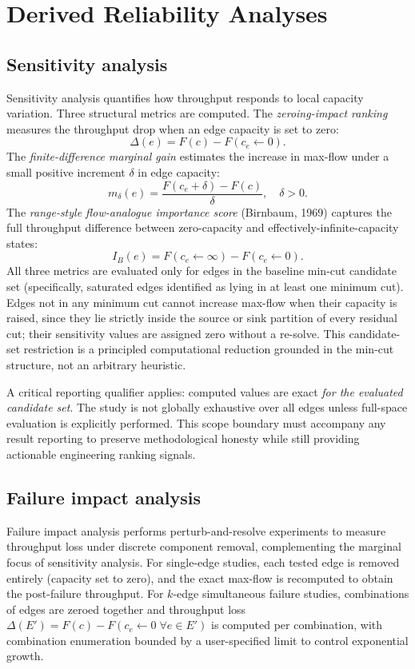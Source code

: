\documentclass[12pt]{report}
\begin{document}
\section{Derived Reliability Analyses}
\label{sec:derived}

\subsection{Sensitivity analysis}

Sensitivity analysis quantifies how throughput responds to local capacity variation. Three structural metrics are computed. The \emph{zeroing-impact ranking} measures the throughput drop when an edge capacity is set to zero:
\[
\Delta(e) = F(c) - F(c_e \leftarrow 0).
\]
The \emph{finite-difference marginal gain} estimates the increase in max-flow under a small positive increment $\delta$ in edge capacity:
\[
m_\delta(e) = \frac{F(c_e + \delta) - F(c)}{\delta}, \quad \delta > 0.
\]
The \emph{range-style flow-analogue importance score} (Birnbaum, 1969) captures the full throughput difference between zero-capacity and effectively-infinite-capacity states:
\[
I_B(e) = F(c_e \leftarrow \infty) - F(c_e \leftarrow 0).
\]
All three metrics are evaluated only for edges in the baseline min-cut candidate set (specifically, saturated edges identified as lying in at least one minimum cut). Edges not in any minimum cut cannot increase max-flow when their capacity is raised, since they lie strictly inside the source or sink partition of every residual cut; their sensitivity values are assigned zero without a re-solve. This candidate-set restriction is a principled computational reduction grounded in the min-cut structure, not an arbitrary heuristic.

A critical reporting qualifier applies: computed values are exact \emph{for the evaluated candidate set}. The study is not globally exhaustive over all edges unless full-space evaluation is explicitly performed. This scope boundary must accompany any result reporting to preserve methodological honesty while still providing actionable engineering ranking signals.

\subsection{Failure impact analysis}

Failure impact analysis performs perturb-and-resolve experiments to measure throughput loss under discrete component removal, complementing the marginal focus of sensitivity analysis. For single-edge studies, each tested edge is removed entirely (capacity set to zero), and the exact max-flow is recomputed to obtain the post-failure throughput. For $k$-edge simultaneous failure studies, combinations of edges are zeroed together and throughput loss $\Delta(E') = F(c) - F(c_e \leftarrow 0\;\forall e\in E')$ is computed per combination, with combination enumeration bounded by a user-specified limit to control exponential growth.
\end{document}
